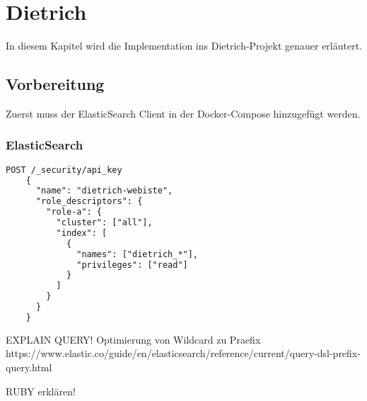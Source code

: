 \chapter{Dietrich}

In diesem Kapitel wird die Implementation ins Dietrich-Projekt genauer erläutert.

\section{Vorbereitung}

Zuerst muss der ElasticSearch Client in der Docker-Compose hinzugefügt werden. 

\subsection{ElasticSearch}

\begin{lstlisting}[language=XML, frame=single, label={lst:es01}] 
    POST /_security/api_key
    {
      "name": "dietrich-webiste",
      "role_descriptors": { 
        "role-a": {
          "cluster": ["all"],
          "index": [
            {
              "names": ["dietrich_*"],
              "privileges": ["read"]
            }
          ]
        }
      }
    }
\end{lstlisting}

EXPLAIN QUERY!
Optimierung von Wildcard zu Praefix
https://www.elastic.co/guide/en/elasticsearch/reference/current/query-dsl-prefix-query.html

RUBY erklären!